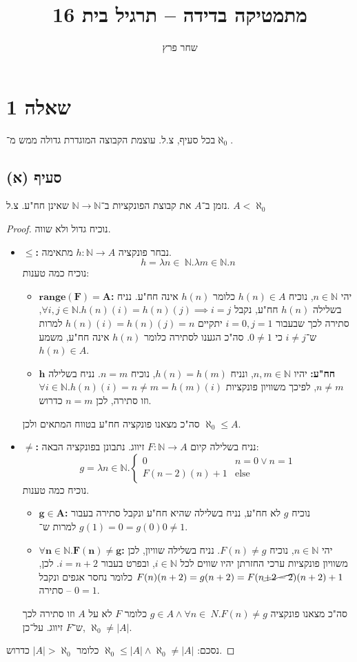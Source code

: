 \documentclass[]{article}
\title{מתמטיקה בדידה – תרגיל בית 16}
\author{שחר פרץ}
\newcommand\N     {\mathbb{N}}
\newcommand\other {\text{else}}
\newcommand\az    {\aleph_0}
\begin{document}
	\maketitle
	\section*{שאלה 1}
	בכל סעיף, צ.ל. עוצמת הקבוצה המוגדרת גדולה ממש מ־$ \az $. 
	\subsection*{סעיף (א)}
	נזמן ב־$ A $ את קבוצת הפונקציות ב־$ \N \to \N $ שאינן חח"ע. צ.ל. $ A < \az $
	\begin{proof} נוכיח גדול ולא שווה. 
		\begin{itemize}
			\item $ \bm{\le} $\textbf{: }נבחר פונקציה $ h \colon \N \to A $ מתאימה. 
			\[ h = \lambda n \in\ \N. \lambda m \in \N. n \]
			נוכיח כמה טענות: 
			\begin{itemize}
				\item $ \bm{\mathbf{range}(F) = A} $\textbf{: }יהי $ n \in \N $, נוכיח $ h(n) \in A $ כלומר $ h(n) $ אינה חח"ע. נניח בשלילה $ h(n) $ חח"ע, נקבל $ \forall i, j \in\N. h(n)(i) = h(n)(j) \implies i = j $, סתירה לכך שבעבור $ i = 0, j = 1 $ יתקיים $ h(n)(i) = h(n)(j) = n $ למרות ש־$ i \neq j $ כי $ 0 \neq 1 $. סה"כ הגענו לסתירה כלומר $ h(n) $ אינה חח"ע, משמע $ h(n) \in A $. 
				\item $ \bm{h} $\textbf{ חח"ע: }יהיו $ n, m \in \N $, ונניח $ h(n) = h(m) $, נוכיח $ n = m $. נניח בשלילה $ n \neq m $, לפיכך משוויון פונקציות $ \forall i \in \N. h(n)(i) = n \neq m = h(m)(i) $ וזו סתירה, לכן $ n = m $ כדרוש. 
			\end{itemize}
			סה"כ מצאנו פונקציה חח"ע בטווח המתאים ולכן $ \az \le A $. 
			\item $ \bm{\neq} $\textbf{: }נניח בשלילה קיום $ F \colon \N \to A $ זיווג. נתבונן בפונקציה הבאה: 
			\[ g = \lambda n \in \N. \begin{cases}
				0 & n = 0 \lor n = 1 \\
				F(n - 2)(n) + 1 &\other
			\end{cases} \]
			נוכיח כמה טענות. 
			\begin{itemize}
				\item $ \bm{g \in A} $\textbf{: }נוכיח $ g $ לא חח"ע, נניח בשלילה שהיא חח"ע ונקבל סתירה בעבור $ g(1) = 0 = g(0) $ למרות ש־$ 0 \neq 1 $. 
				\item $ \bm{\forall n \in \N. F(n) \neq g} $\textbf{: }יהי $ n \in \N $, נוכיח $ F(n) \neq g $. נניח בשלילה שוויון, לכן משוויון פונקציות ערכי החזרתן יהיו שווים לכל $ i \in \N $, ובפרט בעבור $ i = n + 2 $. לכן, $ F(n)(n + 2) = g(n + 2) = F(n \cancel{+ 2 - 2})(n + 2) + 1 $ כלומר נחסר אגפים ונקבל $ 0 = 1 $ – סתירה. 
			\end{itemize}
			סה"כ מצאנו פונקציה $ g \in A \land \forall n \in\ N. F(n) \neq g $ כלומר $ F $ לא על $ A $ וזו סתירה לכך ש־$ F $ זיווג. על־כן, $ \az \neq |A| $. 
		\end{itemize}
		נסכם: $ \az \le |A| \land \az \neq |A| $ כלומר $ |A| > \az $ כדרוש. 
	\end{proof}
\end{document}
